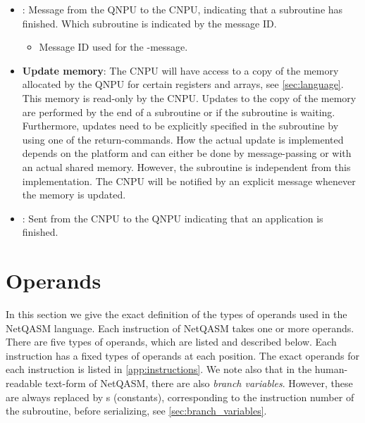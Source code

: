 \begin{itemize}
\begin{itemize}
        \end{itemize}
  \item {}:
        Message from the \ac{QNPU} to the \ac{CNPU}, indicating that a subroutine has finished.
        Which subroutine is indicated by the message ID.
        \begin{itemize}
            \item {} Message ID used for the -message.
        \end{itemize}
  \item \textbf{Update memory}:
        The \ac{CNPU} will have access to a copy of the memory allocated by the \ac{QNPU} for certain registers and arrays, see \cref{sec:language}.
        This memory is read-only by the \ac{CNPU}.
        Updates to the copy of the memory are performed by the end of a subroutine or if the subroutine is waiting.
        Furthermore, updates need to be explicitly specified in the subroutine by using one of the return-commands.
        How the actual update is implemented depends on the platform and can either be done by message-passing or with an actual shared memory.
        However, the subroutine is independent from this implementation.
        The \ac{CNPU} will be notified by an explicit message whenever the memory is updated.
  \item {}:
        Sent from the \ac{CNPU} to the \ac{QNPU} indicating that an application is finished.
\end{itemize}


\section{Operands}
\label{sec:operands}
In this section we give the exact definition of the types of operands used in the \ac{NetQASM} language.
Each instruction of \ac{NetQASM} takes one or more operands.
There are five types of operands, which are listed and described below.
Each instruction has a fixed types of operands at each position.
The exact operands for each instruction is listed in \cref{app:instructions}.
We note also that in the human-readable text-form of \ac{NetQASM}, there are also \textit{branch variables}.
However, these are always replaced by \IMMEDIATE{}s (constants), corresponding to the instruction number of the subroutine, before serializing, see \cref{sec:branch_variables}.

